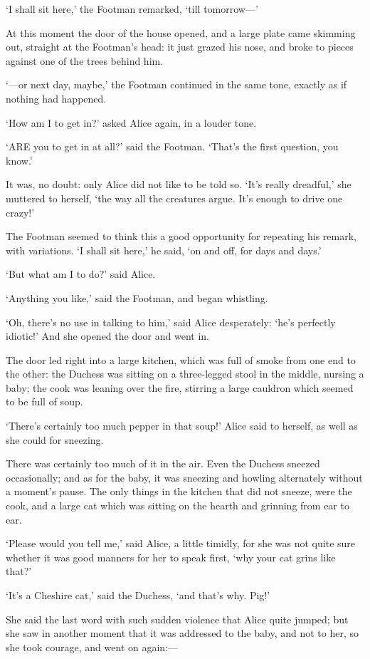 \documentclass[12pt]{book}
\begin{document}
\begin{Parallel}[p]{}{}
{‘I shall sit here,’ the Footman remarked, ‘till tomorrow—’

At this moment the door of the house opened, and a large plate came skimming out, straight at the Footman’s head: it just grazed his nose, and broke to pieces against one of the trees behind him.

‘—or next day, maybe,’ the Footman continued in the same tone, exactly as if nothing had happened.

‘How am I to get in?’ asked Alice again, in a louder tone.

‘ARE you to get in at all?’ said the Footman. ‘That’s the first question, you know.’

It was, no doubt: only Alice did not like to be told so. ‘It’s really dreadful,’ she muttered to herself, ‘the way all the creatures argue. It’s enough to drive one crazy!’

The Footman seemed to think this a good opportunity for repeating his remark, with variations. ‘I shall sit here,’ he said, ‘on and off, for days and days.’

‘But what am I to do?’ said Alice.

‘Anything you like,’ said the Footman, and began whistling.

‘Oh, there’s no use in talking to him,’ said Alice desperately: ‘he’s perfectly idiotic!’ And she opened the door and went in.

The door led right into a large kitchen, which was full of smoke from one end to the other: the Duchess was sitting on a three-legged stool in the middle, nursing a baby; the cook was leaning over the fire, stirring a large cauldron which seemed to be full of soup.

‘There’s certainly too much pepper in that soup!’ Alice said to herself, as well as she could for sneezing.

There was certainly too much of it in the air. Even the Duchess sneezed occasionally; and as for the baby, it was sneezing and howling alternately without a moment’s pause. The only things in the kitchen that did not sneeze, were the cook, and a large cat which was sitting on the hearth and grinning from ear to ear.

‘Please would you tell me,’ said Alice, a little timidly, for she was not quite sure whether it was good manners for her to speak first, ‘why your cat grins like that?’

‘It’s a Cheshire cat,’ said the Duchess, ‘and that’s why. Pig!’

She said the last word with such sudden violence that Alice quite jumped; but she saw in another moment that it was addressed to the baby, and not to her, so she took courage, and went on again:—

}
\end{Parallel}
\end{document}
